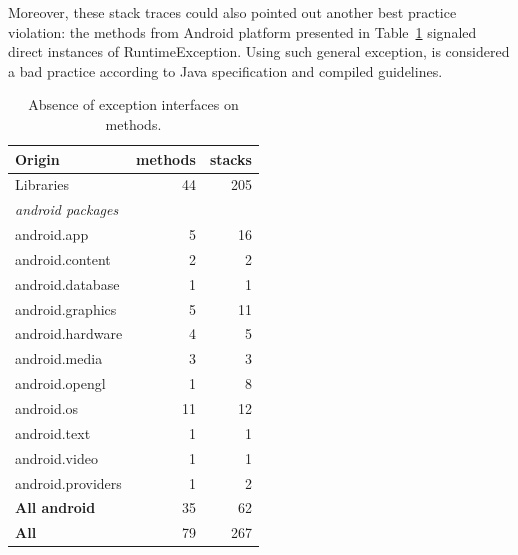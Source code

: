\documentclass[conference]{IEEEtran}
\begin{document}
Moreover, these stack traces could also pointed out another best practice violation: the methods from Android platform
 presented in Table~\ref{tab:runtimeinterface} signaled direct instances of RuntimeException. 
Using such general exception, is considered a bad practice according to Java specification and compiled guidelines.

\noindent {}


\begin{table}
\centering

\begin{tabular}{lrr}
    \hline
 \bfseries{Origin}   & \bfseries{methods} &  \bfseries{stacks}  \\ 
\hline					
Libraries	& 	44	& 	205	\\					
\emph{android packages}   &  &   \\ 
android.app	& 	5	& 	16	\\
android.content	& 	2	& 	2	\\
android.database	& 	1	& 	1	\\
android.graphics	& 	5	& 	11	\\
android.hardware	& 	4	& 	5	\\
android.media	& 	3	& 	3	\\
android.opengl	& 	1	& 	8	\\
android.os	& 	11	& 	12	\\
android.text	& 	1	& 	1	\\
android.video	& 	1	& 	1	\\
android.providers	& 	1	& 	2	\\
\hline					
\bfseries{All android} 	&	35	&	62	\\
\hline					
\bfseries{All}	&	79	&	267	\\
\hline					
  \end{tabular}
\caption{Absence of exception interfaces on methods.}
\label{tab:runtimeinterface}
\end{table}
\end{document}
